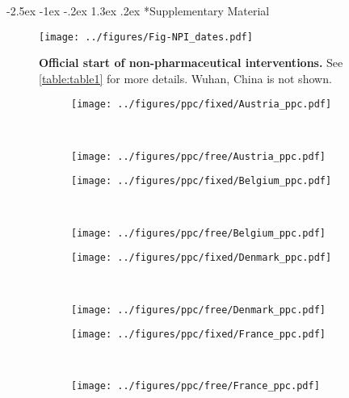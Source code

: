\documentclass[12pt]{extarticle}
\makeatletter
\renewcommand\section{\@startsection {section}{1}{\z@}%
     {-2.5ex \@plus -1ex \@minus -.2ex}%
     {1.3ex \@plus.2ex}%
    {\Large\bfseries}}
\newcommand{\beginsupplement}{%
      	\setcounter{table}{0}
        \renewcommand{\thetable}{S\arabic{table}}%
        \setcounter{figure}{0}
        \renewcommand{\thefigure}{S\arabic{figure}}%
}
\makeatother
\begin{document}
\pagebreak
\section*{Supplementary Material}
\beginsupplement %

\begin{figure}[h]
    \centering
	\texttt{[image: ../figures/Fig-NPI\_dates.pdf]}
    \caption{
    \textbf{Official start of non-pharmaceutical interventions.}
	See \autoref{table:table1} for more details. Wuhan, China is not shown.
    } 
    \label{fig:NPI_dates}
\end{figure}


\begin{figure}[h]	
    \centering
    \begin{subfigure}{0.45\textwidth}
        \texttt{[image: ../figures/ppc/fixed/Austria\_ppc.pdf]}
    \end{subfigure}
    \label{fig:ppc}
    ~
    \begin{subfigure}{0.45\textwidth}
        \texttt{[image: ../figures/ppc/free/Austria\_ppc.pdf]}
    \end{subfigure}
    \begin{subfigure}{0.45\textwidth}
        \texttt{[image: ../figures/ppc/fixed/Belgium\_ppc.pdf]}
    \end{subfigure}
    ~
    \begin{subfigure}{0.45\textwidth}
        \texttt{[image: ../figures/ppc/free/Belgium\_ppc.pdf]}
    \end{subfigure}
     \begin{subfigure}{0.45\textwidth}
        \texttt{[image: ../figures/ppc/fixed/Denmark\_ppc.pdf]}
    \end{subfigure}
    ~
    \begin{subfigure}{0.45\textwidth}
        \texttt{[image: ../figures/ppc/free/Denmark\_ppc.pdf]}
    \end{subfigure}
    \begin{subfigure}{0.45\textwidth}
        \texttt{[image: ../figures/ppc/fixed/France\_ppc.pdf]}
    \end{subfigure}
    ~
    \begin{subfigure}{0.45\textwidth}
        \texttt{[image: ../figures/ppc/free/France\_ppc.pdf]}
    \end{subfigure}
\end{figure}
\end{document}
